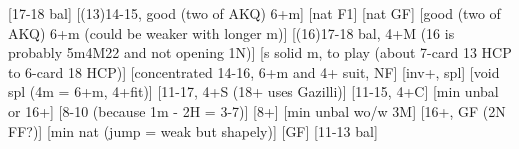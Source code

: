 
\begin{bidsemi}
    [17-18 bal]
    [(13)14-15, good (two of AKQ) 6+m]
        [nat F1]
        [nat GF]
    [good (two of AKQ) 6+m (could be weaker with longer m)]
    [(16)17-18 bal, 4+M (16 is probably 5m4M22 and not opening 1N)]
    [s solid m, to play (about 7-card 13 HCP to 6-card 18 HCP)]
    [concentrated 14-16, 6+m and 4+ suit, NF]
    [inv+, spl]
    [void spl (4m = 6+m, 4+fit)]
    [11-17, 4+S (18+ uses Gazilli)]
    [11-15, 4+C]
    [min unbal or 16+]
    [8-10 (because 1m - 2H = 3-7)]
        [8+]
            [min unbal wo/w 3M]
            [16+, GF (2N FF?)]
        [min nat (jump = weak but shapely)]
            [GF]
    [11-13 bal]
\end{bidsemi}